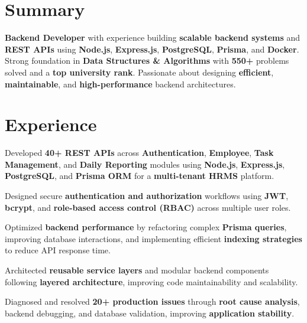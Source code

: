 \documentclass[]{deedy-resume-openfont}
\begin{document}
\hfill
\begin{minipage}[t]{0.66\textwidth}


\section{Summary}
\textbf{Backend Developer} with experience building \textbf{scalable backend systems} and \textbf{REST APIs} using \textbf{Node.js}, \textbf{Express.js}, \textbf{PostgreSQL}, \textbf{Prisma}, and \textbf{Docker}. Strong foundation in \textbf{Data Structures \& Algorithms} with \textbf{550+} problems solved and a \textbf{top university rank}. Passionate about designing \textbf{efficient}, \textbf{maintainable}, and \textbf{high-performance} backend architectures.
\sectionsep


\section{Experience}
\vspace{\topsep}
\begin{tightemize}
  \item Developed \textbf{40+ REST APIs} across \textbf{Authentication}, \textbf{Employee}, \textbf{Task Management}, and \textbf{Daily Reporting} modules using \textbf{Node.js}, \textbf{Express.js}, \textbf{PostgreSQL}, and \textbf{Prisma ORM} for a \textbf{multi-tenant HRMS} platform.
  \item Designed secure \textbf{authentication and authorization} workflows using \textbf{JWT}, \textbf{bcrypt}, and \textbf{role-based access control (RBAC)} across multiple user roles.
  \item Optimized \textbf{backend performance} by refactoring complex \textbf{Prisma queries}, improving database interactions, and implementing efficient \textbf{indexing strategies} to reduce API response time.
  \item Architected \textbf{reusable service layers} and modular backend components following \textbf{layered architecture}, improving code maintainability and scalability.
  \item Diagnosed and resolved \textbf{20+ production issues} through \textbf{root cause analysis}, backend debugging, and database validation, improving \textbf{application stability}.
\end{tightemize}
\sectionsep


\end{minipage}
\end{document}
